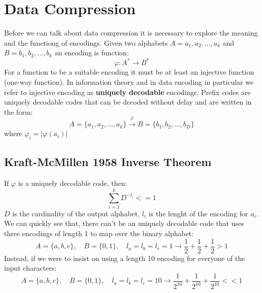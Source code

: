 \section{Data Compression}
Before we can talk about data compression it is necessary to explore the meaning and the functiong of encodings. Given two alphabets $A={a_1,a_2,\ldots,a_k}$ and $B={b_1,b_2,\ldots,b_k}$ an encoding is function:
\begin{equation}
    \varphi: A^* \longrightarrow B^*
\end{equation}
For a function to be a suitable encoding it must be at least an injective function (one-way function). In information theory and in data encoding in particular we refer to injective encoding as \textbf{uniquely decodable} encodings.
Prefix codes are uniquely decodable codes that can be decoded without delay and are written in the form:
\begin{equation}
    A=\{a_1, a_2, \ldots, a_k\} \xrightarrow{\varphi} B=\{b_1, b_2, \ldots, b_D\}
\end{equation}
where $\varphi_i = |\varphi(a_i)|$
    \subsection{Kraft-McMillen 1958 Inverse Theorem}
    If $\varphi$ is a uniquely decodable code, then:
    \begin{equation}
        \sum_{i=1}^{k}{D^{-l_i}}<=1
    \end{equation}
    $D$ is the cardinality of the output alphabet, $l_i$ is the lenght of the encoding for $a_i$. We can quickly see that, there can't be an uniquely decodable code that uses three encodings of length 1 to map over the binary alphabet:
    \begin{equation}
        A=\{a,b,c\},\quad B=\{0,1\}, \quad
        l_a=l_b=l_c=1 \longrightarrow \frac{1}{2}+\frac{1}{2}+\frac{1}{2} >1
    \end{equation}
    Instead, if we were to insist on using a length 10 encoding for everyone of the input characters:
    \begin{equation}
        A=\{a,b,c\},\quad B=\{0,1\},\quad
        l_a=l_b=l_c=10 \longrightarrow \frac{1}{2^{10}}+\frac{1}{2^{10}}+\frac{1}{2^{10}} << 1
    \end{equation}
